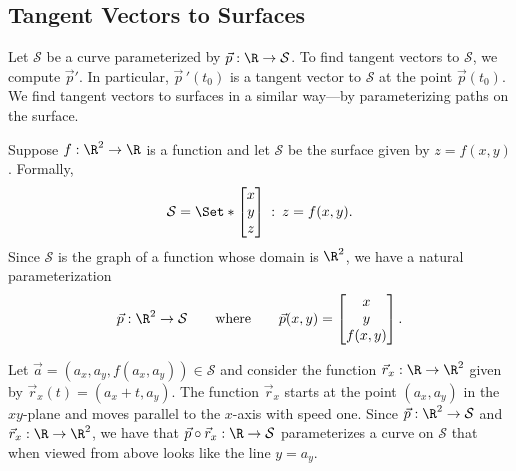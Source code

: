 \subsection{Tangent Vectors to Surfaces}
Let $\mathcal S$ be a curve parameterized by $\vec p:\R\to\mathcal S$.
To find tangent vectors to $\mathcal S$, we compute $\vec p'$.
In particular, $\vec p\,'(t_0)$ is a tangent vector to $\mathcal S$ at the point $\vec p(t_0)$.
We find tangent vectors to surfaces in a similar way---by parameterizing paths on the surface.

Suppose $f:\R^2\to \R$ is a function and let $\mathcal S$ be the surface given by $z=f(x,y)$.  Formally,
\[
	\mathcal S=\Set*{\matc{x\\y\\z}\given z=f(x,y)}.
\]
Since $\mathcal S$ is the graph of a function whose domain is $\R^2$, we have a natural parameterization
\[
	\vec p:\R^2\to\mathcal S\qquad\text{where}\qquad \vec p(x,y)=\matc{x\\y\\f(x,y)}.
\]

Let $\vec a=(a_x,a_y,f(a_x,a_y))\in\mathcal S$ and consider the function $\vec r_x:\R\to\R^2$
given by $\vec r_x(t) = (a_x+t,a_y)$.  The function $\vec r_x$ starts at the point $(a_x,a_y)$
in the $xy$-plane and moves parallel to the $x$-axis with speed one.  Since 
$\vec p:\R^2\to\mathcal S$ and $\vec r_x:\R\to\mathcal \R^2$, we have that $\vec p\circ \vec r_x:\R\to\mathcal S$
parameterizes a curve on $\mathcal S$
 that when viewed from above looks like the line $y=a_y$.

